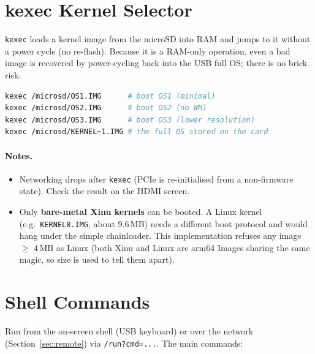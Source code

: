 \documentclass[a4paper,11pt]{article}
\begin{document}
\section{kexec Kernel Selector}
\label{sec:kexec}

\texttt{kexec} loads a kernel image from the microSD into RAM and jumps to
it without a power cycle (no re-flash). Because it is a RAM-only operation,
even a bad image is recovered by power-cycling back into the USB full OS;
there is no brick risk.

\begin{lstlisting}[language=bash]
kexec /microsd/OS1.IMG      # boot OS1 (minimal)
kexec /microsd/OS2.IMG      # boot OS2 (no WM)
kexec /microsd/OS3.IMG      # boot OS3 (lower resolution)
kexec /microsd/KERNEL~1.IMG # the full OS stored on the card
\end{lstlisting}

\paragraph{Notes.}
\begin{itemize}[noitemsep]
  \item Networking drops after \texttt{kexec} (PCIe is re-initialised from a
        non-firmware state). Check the result on the HDMI screen.
  \item Only \textbf{bare-metal Xinu kernels} can be booted. A Linux kernel
        (e.g.\ \texttt{KERNEL8.IMG}, about 9.6\,MB) needs a different boot
        protocol and would hang under the simple chainloader. This
        implementation refuses any image $\geq$ 4\,MB as Linux (both Xinu and
        Linux are arm64 Images sharing the same magic, so size is used to tell
        them apart).
\end{itemize}

\section{Shell Commands}
Run from the on-screen shell (USB keyboard) or over the network
(Section~\ref{sec:remote}) via \texttt{/run?cmd=...}. The main commands:
\end{document}
